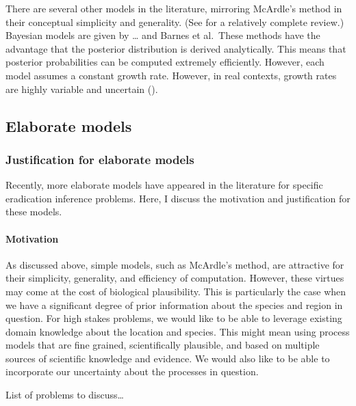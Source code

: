 \documentclass[
]{book}
\begin{document}
There are several other models in the literature, mirroring McArdle's method in their conceptual simplicity and generality. (See \citet{boakes2015} for a relatively complete review.) Bayesian models are given by \ldots{} and Barnes et al.~These methods have the advantage that the posterior distribution is derived analytically. This means that posterior probabilities can be computed extremely efficiently. However, each model assumes a constant growth rate. However, in real contexts, growth rates are highly variable and uncertain (\citet{caley2014}).

\hypertarget{elaborate-models}{%
\subsection{Elaborate models}\label{elaborate-models}}

\hypertarget{justification-for-elaborate-models}{%
\subsubsection{Justification for elaborate models}\label{justification-for-elaborate-models}}

Recently, more elaborate models have appeared in the literature for specific eradication inference problems. Here, I discuss the motivation and justification for these models.

\hypertarget{motivation}{%
\paragraph{Motivation}\label{motivation}}

As discussed above, simple models, such as McArdle's method, are attractive for their simplicity, generality, and efficiency of computation. However, these virtues may come at the cost of biological plausibility. This is particularly the case when we have a significant degree of prior information about the species and region in question. For high stakes problems, we would like to be able to leverage existing domain knowledge about the location and species. This might mean using process models that are fine grained, scientifically plausible, and based on multiple sources of scientific knowledge and evidence. We would also like to be able to incorporate our uncertainty about the processes in question.

List of problems to discuss\ldots{}
\end{document}
